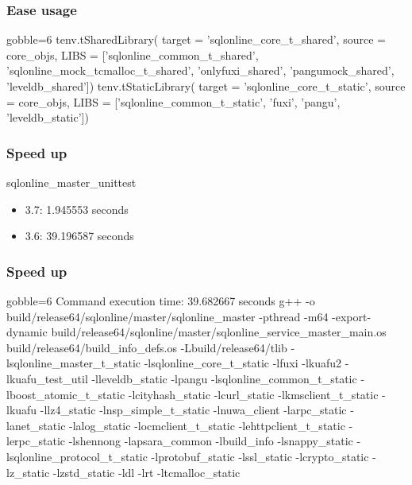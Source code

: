 \documentclass[lualatex]{beamer}
\begin{document}
\begin{frame}[fragile]
  \frametitle{Ease usage}

  \begin{block}{3.7}
    \begin{py*}{gobble=6}
      tenv.tSharedLibrary(
          target = 'sqlonline_core_t_shared',
          source = core_objs,
          LIBS = ['sqlonline_common_t_shared',
                  'sqlonline_mock_tcmalloc_t_shared',
                  'onlyfuxi_shared',
                  'pangumock_shared',
                  'leveldb_shared'])
      tenv.tStaticLibrary(
          target = 'sqlonline_core_t_static',
          source = core_objs,
          LIBS = ['sqlonline_common_t_static',
                  'fuxi', 'pangu', 'leveldb_static'])
    \end{py*}
  \end{block}
\end{frame}

\begin{frame}
  \frametitle{Speed up}

  \begin{block}{sqlonline\_master\_unittest}
    \begin{itemize}
    \item 3.7: 1.945553 seconds
    \item 3.6: 39.196587 seconds
    \end{itemize}
  \end{block}
\end{frame}

\begin{frame}[fragile]
  \frametitle{Speed up}

  \begin{block}{3.7}
    \begin{txt*}{gobble=6}
      Command execution time: 39.682667 seconds
      g++ -o build/release64/sqlonline/master/sqlonline_master -pthread -m64 -export-dynamic build/release64/sqlonline/master/sqlonline_service_master_main.os build/release64/build_info_defs.os -Lbuild/release64/tlib -lsqlonline_master_t_static -lsqlonline_core_t_static -lfuxi -lkuafu2 -lkuafu_test_util -lleveldb_static -lpangu -lsqlonline_common_t_static -lboost_atomic_t_static -lcityhash_static -lcurl_static -lkmsclient_t_static -lkuafu -llz4_static -lnsp_simple_t_static -lnuwa_client -larpc_static -lanet_static -lalog_static -locmclient_t_static -lehttpclient_t_static -lerpc_static -lshennong -lapsara_common -lbuild_info -lsnappy_static -lsqlonline_protocol_t_static -lprotobuf_static -lssl_static -lcrypto_static -lz_static -lzstd_static -ldl -lrt -ltcmalloc_static
    \end{txt*}
  \end{block}
\end{frame}
\end{document}
